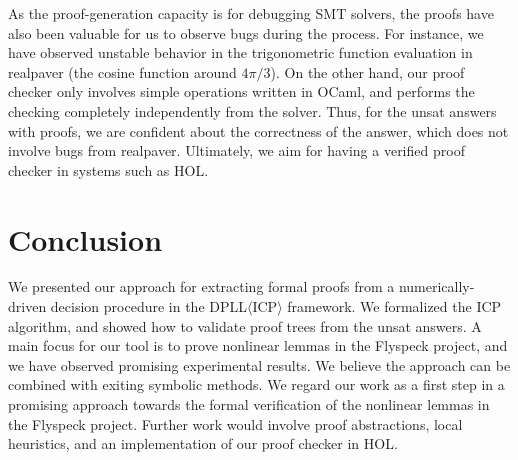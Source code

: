 \documentclass[12pt]{article}
\begin{document}
As the proof-generation capacity is for debugging SMT solvers, the proofs have
also been valuable for us to observe bugs during the process. For instance, we
have observed unstable behavior in the trigonometric function evaluation in {\sf
realpaver} (the cosine function around $4\pi/3$). On the other hand, our proof
checker only involves simple operations written in {\sf OCaml}, and performs the
checking completely independently from the solver.
Thus, for the {\sf unsat} answers with proofs, we are
confident about the correctness of the answer, which does not involve bugs from
{\sf realpaver}. Ultimately, we aim for having a verified proof checker in
systems such as HOL.


\section{Conclusion}

We presented our approach for extracting formal proofs from a numerically-driven
decision procedure in the DPLL$\langle$ICP$\rangle$ framework. We formalized the ICP algorithm, and showed how to validate proof trees from the unsat answers.  A main focus for our tool is to prove
nonlinear lemmas in the Flyspeck project, and we have observed promising
experimental results. We believe the approach can be combined with exiting
symbolic methods. We regard our work as a first step in a promising approach towards the formal
verification of the nonlinear lemmas in the Flyspeck project. Further work
would involve proof abstractions, local heuristics, and an implementation of our proof checker in HOL.





\end{document}
